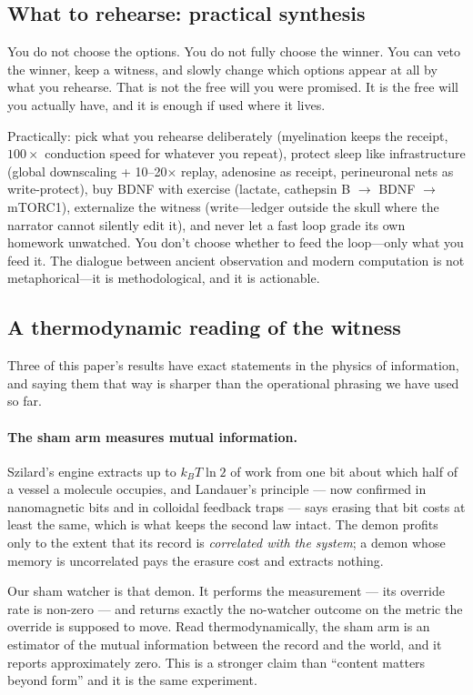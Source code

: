 \documentclass[11pt]{article}
\begin{document}
\subsection{What to rehearse: practical synthesis}

You do not choose the options. You do not fully choose the winner. You
can veto the winner, keep a witness, and slowly change which options
appear at all by what you rehearse. That is not the free will you were
promised. It is the free will you actually have, and it is enough if
used where it lives.

Practically: pick what you rehearse deliberately (myelination keeps the
receipt, $100\times$ conduction speed for whatever you repeat), protect
sleep like infrastructure (global downscaling + 10--20$\times$ replay,
adenosine as receipt, perineuronal nets as write-protect), buy BDNF
with exercise (lactate, cathepsin B $\to$\allowbreak{} BDNF $\to$\allowbreak{} mTORC1), externalize
the witness (write---ledger outside the skull where the narrator cannot
silently edit it), and never let a fast loop grade its own homework
unwatched. You don't choose whether to feed the loop---only what you
feed it. The dialogue between ancient observation and modern computation
is not metaphorical---it is methodological, and it is actionable.


\subsection{A thermodynamic reading of the witness}
\label{sec:thermo}

Three of this paper's results have exact statements in the physics of
information, and saying them that way is sharper than the operational
phrasing we have used so far.

\paragraph{The sham arm measures mutual information.} Szilard's engine extracts
up to $k_BT\ln 2$ of work from one bit about which half of a vessel a molecule
occupies, and Landauer's principle --- now confirmed in nanomagnetic bits and
in colloidal feedback traps --- says erasing that bit costs at least the same,
which is what keeps the second law intact. The demon profits only to the extent
that its record is \emph{correlated with the system}; a demon whose memory is
uncorrelated pays the erasure cost and extracts nothing.

Our sham watcher is that demon. It performs the measurement --- its override
rate is non-zero --- and returns exactly the no-watcher outcome on the metric
the override is supposed to move. Read thermodynamically, the sham arm is an
estimator of the mutual information between the record and the world, and it
reports approximately zero. This is a stronger claim than ``content matters
beyond form'' and it is the same experiment.
\end{document}
